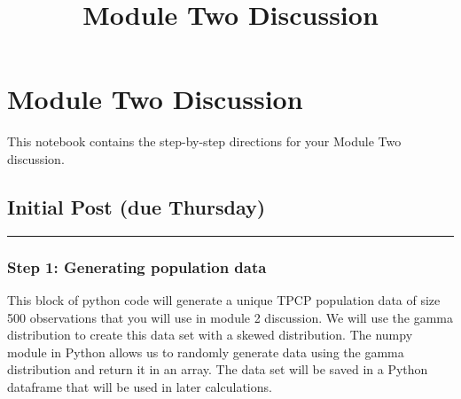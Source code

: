 \documentclass[11pt]{article}
\title{Module Two Discussion}
\begin{document}
    
    
    \maketitle
    
    

    
    \hypertarget{module-two-discussion}{%
\section{Module Two Discussion}\label{module-two-discussion}}

This notebook contains the step-by-step directions for your Module Two
discussion.

    \hypertarget{initial-post-due-thursday}{%
\subsection{Initial Post (due
Thursday)}\label{initial-post-due-thursday}}

\begin{center}\rule{0.5\linewidth}{\linethickness}\end{center}

    \hypertarget{step-1-generating-population-data}{%
\subsubsection{Step 1: Generating population
data}\label{step-1-generating-population-data}}

This block of python code will generate a unique TPCP population data of
size 500 observations that you will use in module 2 discussion. We will
use the gamma distribution to create this data set with a skewed
distribution. The numpy module in Python allows us to randomly generate
data using the gamma distribution and return it in an array. The data
set will be saved in a Python dataframe that will be used in later
calculations.
\end{document}
